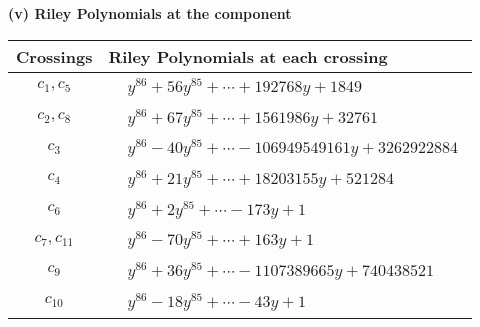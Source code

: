 \documentclass[1p]{elsarticle_modified}
\theoremstyle{definition}
\begin{document}
\newpage\renewcommand{\arraystretch}{1}
\flushleft \textbf{(v) Riley Polynomials at the component}\newline \\
\begin{tabular}{m{50pt}|m{274pt}}
Crossings & \hspace{64pt}Riley Polynomials at each crossing \\
\hline $$\begin{aligned}c_{1},c_{5}\end{aligned}$$&$\begin{aligned}
&y^{86}+56 y^{85}+\cdots+192768 y+1849
\end{aligned}$\\
\hline $$\begin{aligned}c_{2},c_{8}\end{aligned}$$&$\begin{aligned}
&y^{86}+67 y^{85}+\cdots+1561986 y+32761
\end{aligned}$\\
\hline $$\begin{aligned}c_{3}\end{aligned}$$&$\begin{aligned}
&y^{86}-40 y^{85}+\cdots-106949549161 y+3262922884
\end{aligned}$\\
\hline $$\begin{aligned}c_{4}\end{aligned}$$&$\begin{aligned}
&y^{86}+21 y^{85}+\cdots+18203155 y+521284
\end{aligned}$\\
\hline $$\begin{aligned}c_{6}\end{aligned}$$&$\begin{aligned}
&y^{86}+2 y^{85}+\cdots-173 y+1
\end{aligned}$\\
\hline $$\begin{aligned}c_{7},c_{11}\end{aligned}$$&$\begin{aligned}
&y^{86}-70 y^{85}+\cdots+163 y+1
\end{aligned}$\\
\hline $$\begin{aligned}c_{9}\end{aligned}$$&$\begin{aligned}
&y^{86}+36 y^{85}+\cdots-1107389665 y+740438521
\end{aligned}$\\
\hline $$\begin{aligned}c_{10}\end{aligned}$$&$\begin{aligned}
&y^{86}-18 y^{85}+\cdots-43 y+1
\end{aligned}$\\
\hline
\end{tabular}\\~\\
\end{document}
